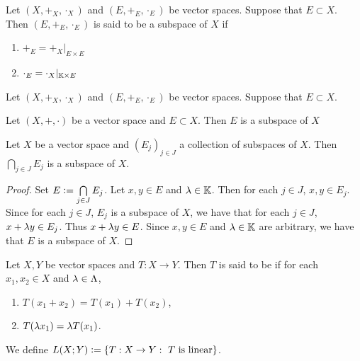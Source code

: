 \documentclass{book}
\begin{document}
 
 \begin{defn}
 	Let $(X, +_X, \cdot_X)$ and $(E, +_E, \cdot_E)$ be vector spaces. Suppose that $E \subset X$. Then $(E, +_E, \cdot_E)$ is said to be a subspace of $X$ if 
 	\begin{enumerate}
 		\item $+_E = +_X|_{E \times E}$
 		\item $\cdot_E = \cdot_X|_{\mathbb{K} \times E}$
 	\end{enumerate}
 \end{defn}
 
 \begin{ex}
 	Let $(X, +_X, \cdot_X)$ and $(E, +_E, \cdot_E)$ be vector spaces. Suppose that $E \subset X$. 
 \end{ex}
 
 \begin{ex}
 	Let $(X, +, \cdot)$ be a vector space and $E \subset X$. Then $E$ is a subspace of $X$
 \end{ex}
 
 
 \begin{defn}
 	Let $X$ be a vector space and $(E_j)_{j \in J}$ a collection of subspaces of $X$. Then $\bigcap\limits_{j \in J}E_j$ is a subspace of $X$. 
 \end{defn}
 
 \begin{proof}
 	Set $E \vcentcolon= \bigcap\limits_{j \in J}E_j$. Let $x,y \in E$ and $\lambda \in \mathbb{K}$. Then for each $j \in J$, $x,y \in E_j$. Since for each $j \in J$, $E_j$ is a subspace of $X$, we have that for each $j \in J$, $x+ \lambda y \in E_j$. Thus $x+\lambda y \in E$. Since $x,y \in E$ and $\lambda \in \mathbb{K}$ are arbitrary,  we have that $E$ is a subspace of $X$. 
 \end{proof}
 
 
 
 
 
 
 
 
 
 
 
 
 
 
 
 
 
 
 
 
 
 
 
 
 
 
 \begin{defn}
 	Let $X, Y$ be vector spaces and $T:X \rightarrow Y$. Then $T$ is said to be  if for each $x_1, x_2 \in X$ and $\lambda \in \Lambda$, 
 	\begin{enumerate}
 		\item $T(x_1 + x_2) = T(x_1) + T(x_2)$,
 		\item $T(\lambda x_1) = \lambda T(x_1)$.
 	\end{enumerate}
 	We define $L(X;Y) \vcentcolon= \{T:X \rightarrow Y: \text{ $T$ is linear}\}$. 
 \end{defn}
 
\end{document}
